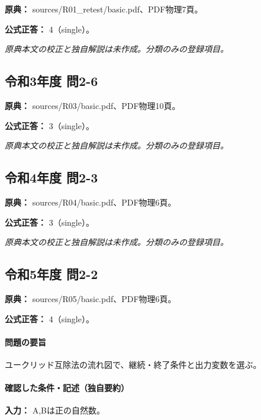\noindent\textbf{原典：} sources/R01\_retest/basic.pdf、PDF物理7頁。

\textbf{公式正答：} 4（single）。

\par\textit{原典本文の校正と独自解説は未作成。分類のみの登録項目。}

\subsection{令和3年度 問2-6}
\label{q:r03-reg-basic-2-6}

\noindent\textbf{原典：} sources/R03/basic.pdf、PDF物理10頁。

\textbf{公式正答：} 3（single）。

\par\textit{原典本文の校正と独自解説は未作成。分類のみの登録項目。}

\subsection{令和4年度 問2-3}
\label{q:r04-reg-basic-2-3}

\noindent\textbf{原典：} sources/R04/basic.pdf、PDF物理6頁。

\textbf{公式正答：} 3（single）。

\par\textit{原典本文の校正と独自解説は未作成。分類のみの登録項目。}

\subsection{令和5年度 問2-2}
\label{q:r05-reg-basic-2-2}

\noindent\textbf{原典：} sources/R05/basic.pdf、PDF物理6頁。

\textbf{公式正答：} 4（single）。

\paragraph{問題の要旨} ユークリッド互除法の流れ図で、継続・終了条件と出力変数を選ぶ。

\paragraph{確認した条件・記述（独自要約）}\mbox{}\par

\noindent\textbf{入力：} A,Bは正の自然数。\par

